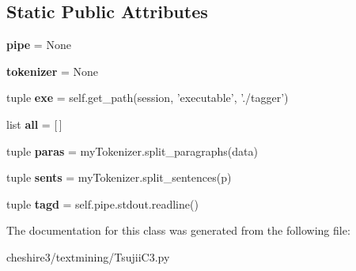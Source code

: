\subsection*{Static Public Attributes}
\begin{DoxyCompactItemize}
\item 
\hypertarget{classcheshire3_1_1textmining_1_1_tsujii_c3_1_1_tsujii_object_ac24d0be98ae0edf436ae7f28942f56c7}{{\bfseries pipe} = None}\label{classcheshire3_1_1textmining_1_1_tsujii_c3_1_1_tsujii_object_ac24d0be98ae0edf436ae7f28942f56c7}

\item 
\hypertarget{classcheshire3_1_1textmining_1_1_tsujii_c3_1_1_tsujii_object_a51045dcd0f372eeaf8187235364a3210}{{\bfseries tokenizer} = None}\label{classcheshire3_1_1textmining_1_1_tsujii_c3_1_1_tsujii_object_a51045dcd0f372eeaf8187235364a3210}

\item 
\hypertarget{classcheshire3_1_1textmining_1_1_tsujii_c3_1_1_tsujii_object_ae511df04d7723414bc7662950edea018}{tuple {\bfseries exe} = self.\-get\-\_\-path(session, 'executable', './tagger')}\label{classcheshire3_1_1textmining_1_1_tsujii_c3_1_1_tsujii_object_ae511df04d7723414bc7662950edea018}

\item 
\hypertarget{classcheshire3_1_1textmining_1_1_tsujii_c3_1_1_tsujii_object_a820a3075103506140049ac363653bfc6}{list {\bfseries all} = \mbox{[}$\,$\mbox{]}}\label{classcheshire3_1_1textmining_1_1_tsujii_c3_1_1_tsujii_object_a820a3075103506140049ac363653bfc6}

\item 
\hypertarget{classcheshire3_1_1textmining_1_1_tsujii_c3_1_1_tsujii_object_a057dee86a92368dc215c729dc581ba21}{tuple {\bfseries paras} = my\-Tokenizer.\-split\-\_\-paragraphs(data)}\label{classcheshire3_1_1textmining_1_1_tsujii_c3_1_1_tsujii_object_a057dee86a92368dc215c729dc581ba21}

\item 
\hypertarget{classcheshire3_1_1textmining_1_1_tsujii_c3_1_1_tsujii_object_a968784e251851fc83b031c5534ae293a}{tuple {\bfseries sents} = my\-Tokenizer.\-split\-\_\-sentences(p)}\label{classcheshire3_1_1textmining_1_1_tsujii_c3_1_1_tsujii_object_a968784e251851fc83b031c5534ae293a}

\item 
\hypertarget{classcheshire3_1_1textmining_1_1_tsujii_c3_1_1_tsujii_object_a45ecc7573ef638a88c7a1ccd3b641ff5}{tuple {\bfseries tagd} = self.\-pipe.\-stdout.\-readline()}\label{classcheshire3_1_1textmining_1_1_tsujii_c3_1_1_tsujii_object_a45ecc7573ef638a88c7a1ccd3b641ff5}

\end{DoxyCompactItemize}


The documentation for this class was generated from the following file\-:\begin{DoxyCompactItemize}
\item 
cheshire3/textmining/Tsujii\-C3.\-py\end{DoxyCompactItemize}

